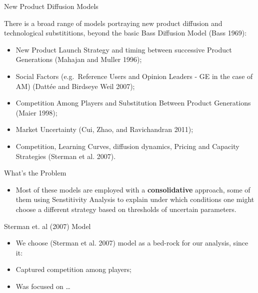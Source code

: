 \documentclass[12pt,ignorenonframetext,]{beamer}
\providecommand{\tightlist}{%
  \setlength{\itemsep}{0pt}\setlength{\parskip}{0pt}}
\begin{document}
\begin{frame}{New Product Diffusion Models}

There is a broad range of models portraying new product diffusion and
technological substititions, beyond the basic Bass Diffusion Model (Bass
1969):

\begin{itemize}
\tightlist
\item
  New Product Launch Strategy and timing between successive Product
  Generations (Mahajan and Muller 1996);
\item
  Social Factors (e.g.~Reference Users and Opinion Leaders - GE in the
  case of AM) (Dattée and Birdseye Weil 2007);
\item
  Competition Among Players and Substitution Between Product Generations
  (Maier 1998);
\item
  Market Uncertainty (Cui, Zhao, and Ravichandran 2011);
\item
  Competition, Learning Curves, diffusion dynamics, Pricing and Capacity
  Strategies (Sterman et al. 2007).
\end{itemize}

\end{frame}

\begin{frame}{What's the Problem}

\begin{itemize}
\tightlist
\item
  Most of these models are employed with a \textbf{consolidative}
  approach, some of them using Senstitivity Analysis to explain under
  which conditions one might choose a different strategy based on
  thresholds of uncertain parameters.
\end{itemize}

\end{frame}

\begin{frame}{Sterman et. al (2007) Model}

\begin{itemize}
\tightlist
\item
  We choose (Sterman et al. 2007) model as a bed-rock for our analysis,
  since it:
\item
  Captured competition among players;
\item
  Was focused on \ldots{}
\end{itemize}

\end{frame}
\end{document}
